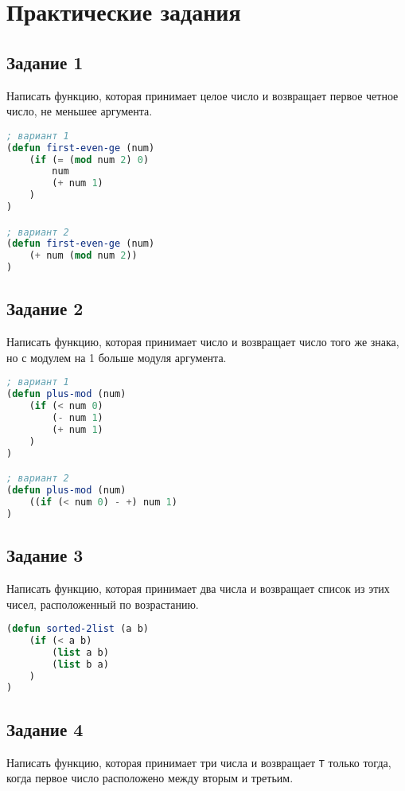 \chapter{Практические задания}

\section{Задание 1}

Написать функцию, которая принимает целое число и возвращает первое
четное число, не меньшее аргумента.

\begin{lstlisting}[language=Lisp]
; вариант 1
(defun first-even-ge (num)
	(if (= (mod num 2) 0)
		num
		(+ num 1)
	)
)

; вариант 2
(defun first-even-ge (num)
	(+ num (mod num 2))
)
\end{lstlisting}

\section{Задание 2}

Написать функцию, которая принимает число и возвращает число
того же знака, но с модулем на 1 больше модуля аргумента.

\begin{lstlisting}[language=Lisp]
; вариант 1
(defun plus-mod (num)
	(if (< num 0)
		(- num 1)
		(+ num 1)
	)
)

; вариант 2
(defun plus-mod (num)
	((if (< num 0) - +) num 1)
)
\end{lstlisting}

\clearpage

\section{Задание 3}

Написать функцию, которая принимает два числа и возвращает
список из этих чисел, расположенный по возрастанию.

\begin{lstlisting}[language=Lisp]
(defun sorted-2list (a b)
	(if (< a b)
		(list a b)
		(list b a)
	)
)
\end{lstlisting}

\section{Задание 4}

Написать функцию, которая принимает три числа и возвращает \texttt{T} только
тогда, когда первое число расположено между вторым и третьим.

